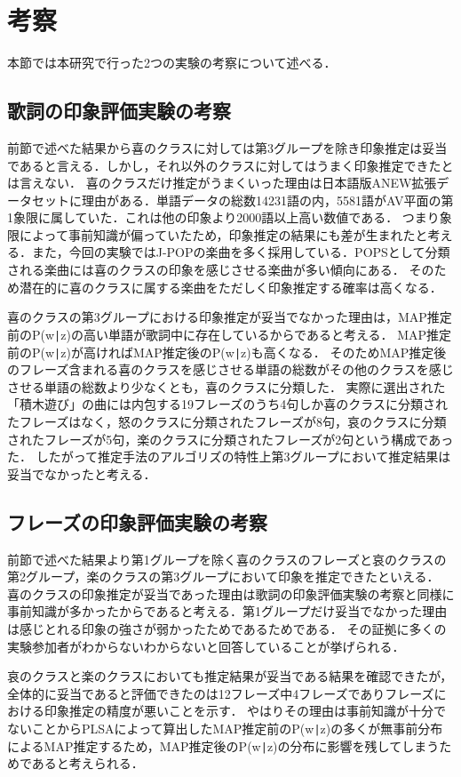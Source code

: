 \section{考察}
本節では本研究で行った2つの実験の考察について述べる．

\subsection{歌詞の印象評価実験の考察}
前節で述べた結果から喜のクラスに対しては第3グループを除き印象推定は妥当であると言える．しかし，それ以外のクラスに対してはうまく印象推定できたとは言えない．
喜のクラスだけ推定がうまくいった理由は日本語版ANEW拡張データセットに理由がある．単語データの総数14231語の内，5581語がAV平面の第1象限に属していた．これは他の印象より2000語以上高い数値である．
つまり象限によって事前知識が偏っていたため，印象推定の結果にも差が生まれたと考える．また，今回の実験ではJ-POPの楽曲を多く採用している．POPSとして分類される楽曲には喜のクラスの印象を感じさせる楽曲が多い傾向にある．
そのため潜在的に喜のクラスに属する楽曲をただしく印象推定する確率は高くなる．

喜のクラスの第3グループにおける印象推定が妥当でなかった理由は，MAP推定前のP(w\verb+|+z)の高い単語が歌詞中に存在しているからであると考える．
MAP推定前のP(w\verb+|+z)が高ければMAP推定後のP(w\verb+|+z)も高くなる．
そのためMAP推定後のフレーズ含まれる喜のクラスを感じさせる単語の総数がその他のクラスを感じさせる単語の総数より少なくとも，喜のクラスに分類した．
実際に選出された「積木遊び」の曲には内包する19フレーズのうち4句しか喜のクラスに分類されたフレーズはなく，怒のクラスに分類されたフレーズが8句，哀のクラスに分類されたフレーズが5句，楽のクラスに分類されたフレーズが2句という構成であった．
したがって推定手法のアルゴリズの特性上第3グループにおいて推定結果は妥当でなかったと考える．

\subsection{フレーズの印象評価実験の考察}
前節で述べた結果より第1グループを除く喜のクラスのフレーズと哀のクラスの第2グループ，楽のクラスの第3グループにおいて印象を推定できたといえる．
喜のクラスの印象推定が妥当であった理由は歌詞の印象評価実験の考察と同様に事前知識が多かったからであると考える．第1グループだけ妥当でなかった理由は感じとれる印象の強さが弱かったためであるためである．
その証拠に多くの実験参加者がわからないわからないと回答していることが挙げられる．

哀のクラスと楽のクラスにおいても推定結果が妥当である結果を確認できたが，全体的に妥当であると評価できたのは12フレーズ中4フレーズでありフレーズにおける印象推定の精度が悪いことを示す．
やはりその理由は事前知識が十分でないことからPLSAによって算出したMAP推定前のP(w\verb+|+z)の多くが無事前分布によるMAP推定するため，MAP推定後のP(w\verb+|+z)の分布に影響を残してしまうためであると考えられる．
